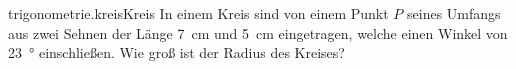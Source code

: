 \begin{exercise}{trigonometrie.kreis}{Kreis}
  \ifproblem\problem
    In einem Kreis sind von einem Punkt $P$ seines Umfangs aus
    zwei Sehnen der Länge \SI{7}{\centi\metre} und
    \SI{5}{\centi\metre} eingetragen, welche einen Winkel von
    \SI{23}{\degree} einschließen. Wie groß ist der Radius
    des Kreises?
  \fi
\end{exercise}
